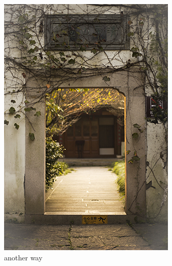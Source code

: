 \begin{figure}[htb]
	\centering 
	\includegraphics[scale=1.0]{./Pictures/test.jpg} 
	\caption{another way} 
\end{figure}

